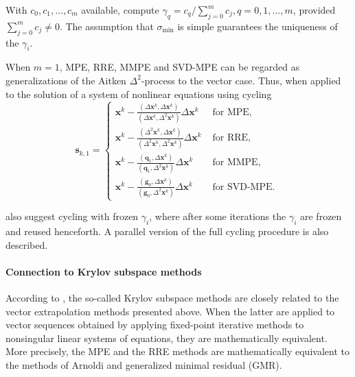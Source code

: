 With \(c_{0}, c_{1}, \ldots, c_{m}\) available, compute \(\gamma_{q}=c_{q} / \sum_{j=0}^{m} c_{j}, q=0,1, \ldots, m\), provided \(\sum_{j=0}^{m} c_{j} \neq 0\).
The assumption that \(\sigma_{\min }\) is simple guarantees the uniqueness of the \(\gamma_{i}\).

When \(m=1\), MPE, RRE, MMPE and SVD-MPE can be regarded as generalizations of the Aitken \(\Delta^2\)-process to the vector case.
Thus, when applied to the solution of a system of nonlinear equations using cycling
\begin{equation}
\mathbf{s}_{k, 1}=\begin{cases}
\mathbf x^{k}-\displaystyle\frac{\left(\Delta \mathbf x^{k}, \Delta \mathbf x^{k}\right)}{\left(\Delta \mathbf x^{k}, \Delta^{2} \mathbf x^{k}\right)} \Delta \mathbf x^{k} & \text { for MPE, } \\[10pt]
\mathbf x^{k}-\displaystyle\frac{\left(\Delta^{2} \mathbf x^{k}, \Delta\mathbf  x^{k}\right)}{\left(\Delta^{2} \mathbf x^{k}, \Delta^{2} \mathbf x^{k}\right)} \Delta \mathbf x^{k} & \text { for RRE, } \\[10pt]
\mathbf x^{k}-\displaystyle\frac{\left(\mathbf  q_{1}, \Delta \mathbf x^{k}\right)}{\left(\mathbf  q_{1}, \Delta^{2} \mathbf  x^{k}\right)} \Delta \mathbf x^{k} & \text { for MMPE, } \\[10pt]
\mathbf x^{k}-\displaystyle\frac{\left(\mathbf g_{0}, \Delta\mathbf x^{k}\right)}{\left( \mathbf g_{0}, \Delta^{2} \mathbf x^{k}\right)} \Delta \mathbf  x^{k} & \text { for SVD-MPE. }
\end{cases}
\end{equation}

\cite{sidi_vector_2017} also suggest cycling with frozen \(\gamma_i\), where after some iterations the \(\gamma_i\) are frozen and reused henceforth.
A parallel version of the full cycling procedure is also described.

\paragraph{Connection to Krylov subspace methods}

According to \cite{sidi_vector_2017}, the so-called Krylov subspace methods are closely related to the vector extrapolation methods presented above.
When the latter are applied to vector sequences obtained by applying fixed-point iterative methods to nonsingular linear systems of equations, they are mathematically equivalent.
More precisely, the MPE and the RRE methods are mathematically equivalent to the methods of Arnoldi and generalized minimal residual (GMR).

